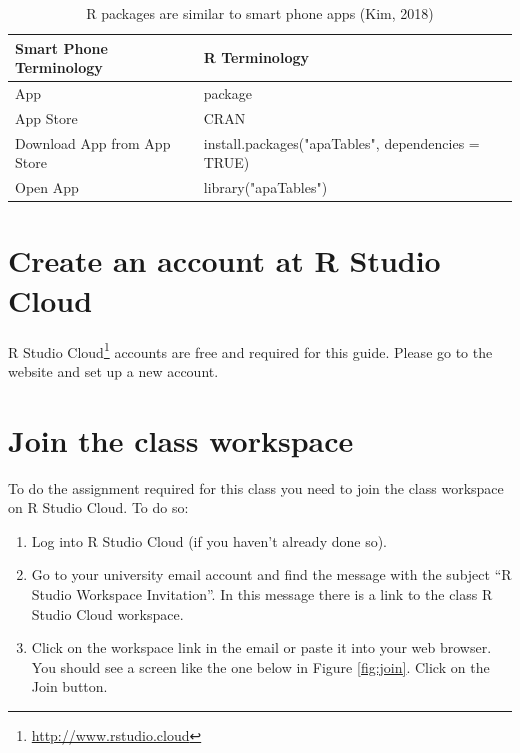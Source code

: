 \documentclass[
]{krantz}
\renewcommand{\href}[2]{#2\footnote{\url{#1}}}
\begin{document}
\begin{table}

\caption{\label{tab:appstore}R packages are similar to smart phone apps (Kim, 2018)}
\centering
\begin{tabular}[t]{ll}
\toprule
Smart Phone Terminology & R Terminology\\
\midrule
App & package\\
App Store & CRAN\\
Download App from App Store & install.packages("apaTables", dependencies = TRUE)\\
Open App & library("apaTables")\\
\bottomrule
\end{tabular}
\end{table}

\hypertarget{create-an-account-at-r-studio-cloud}{%
\section{Create an account at R Studio Cloud}\label{create-an-account-at-r-studio-cloud}}

\href{http://www.rstudio.cloud}{R Studio Cloud} accounts are free and required for this guide. Please go to the website and set up a new account.

\hypertarget{join-the-class-workspace}{%
\section{Join the class workspace}\label{join-the-class-workspace}}

To do the assignment required for this class you need to join the class workspace on R Studio Cloud. To do so:

\begin{enumerate}
\def\labelenumi{\arabic{enumi}.}
\item
  Log into R Studio Cloud (if you haven't already done so).
\item
  Go to your university email account and find the message with the subject ``R Studio Workspace Invitation''. In this message there is a link to the class R Studio Cloud workspace.
\item
  Click on the workspace link in the email or paste it into your web browser. You should see a screen like the one below in Figure \ref{fig:join}. Click on the Join button.
\end{enumerate}
\end{document}
